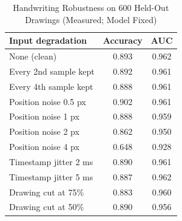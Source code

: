 \begin{table}[t]
\centering
\caption{Handwriting Robustness on 600 Held-Out Drawings (Measured; Model Fixed)}
\label{tab:hwrobust}
\footnotesize
\begin{tabular}{@{}lcc@{}}
\toprule
Input degradation & Accuracy & AUC \\
\midrule
None (clean) & 0.893 & 0.962 \\
Every 2nd sample kept & 0.892 & 0.961 \\
Every 4th sample kept & 0.888 & 0.961 \\
Position noise 0.5 px & 0.902 & 0.961 \\
Position noise 1 px & 0.888 & 0.959 \\
Position noise 2 px & 0.862 & 0.950 \\
Position noise 4 px & 0.648 & 0.928 \\
Timestamp jitter 2 ms & 0.890 & 0.961 \\
Timestamp jitter 5 ms & 0.887 & 0.962 \\
Drawing cut at 75\% & 0.883 & 0.960 \\
Drawing cut at 50\% & 0.890 & 0.956 \\
\bottomrule
\end{tabular}
\end{table}

